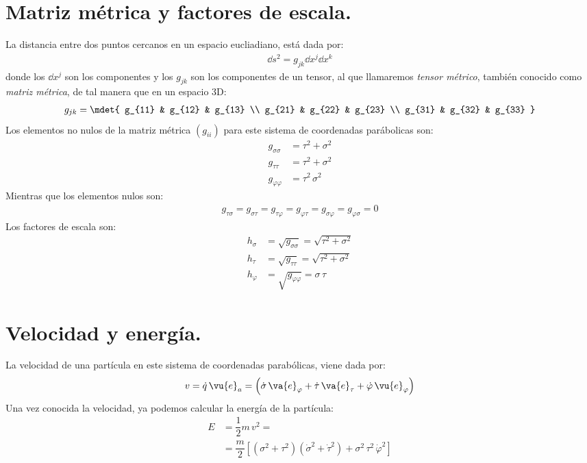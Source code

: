 \section{Matriz métrica y factores de escala.}
La distancia entre dos puntos cercanos en un espacio eucliadiano, está dada por:
\begin{align*}
\dd{s^{2}} = g_{jk} \dd{x^{j}} \dd{x^{k}}
\end{align*}
donde los $\dd{x^{j}}$ son los componentes y los $g_{jk}$ son los componentes de un tensor, al que llamaremos \emph{tensor métrico}, también conocido como \emph{matriz métrica}, de tal manera que en un espacio 3D:
\begin{align*}
g_{jk} = \mdet{
g_{11} & g_{12} & g_{13} \\
g_{21} & g_{22} & g_{23} \\
g_{31} & g_{32} & g_{33}
}
\end{align*}
Los elementos no nulos de la matriz métrica $(g_{ii})$ para este sistema de coordenadas parábolicas son:
\begin{align*}
g_{\sigma \sigma} &= \tau^{2} + \sigma^{2} \\[0.5em]
g_{\tau \tau} &= \tau^{2} + \sigma^{2} \\[0.5em]
g_{\varphi \varphi} &= \tau^{2} \, \sigma^{2}
\end{align*}
Mientras que los elementos nulos son:
\begin{align*}
g_{\tau \sigma} = g_{\sigma \tau} = g_{\tau \varphi} = g_{\varphi \tau} = g_{\sigma \varphi} = g_{\varphi \sigma} = 0
\end{align*}
Los factores de escala son:
\begin{align*}
h_{\sigma} &= \sqrt{g_{\sigma \sigma}} = \sqrt{\tau^{2} + \sigma^{2}} \\[0.5em]
h_{\tau} &= \sqrt{g_{\tau \tau}} = \sqrt{\tau^{2} + \sigma^{2}} \\[0.5em]
h_{\varphi} &= \sqrt{g_{\varphi \varphi}} = \sigma \, \tau
\end{align*}
\section{Velocidad y energía.}
La velocidad de una partícula en este sistema de coordenadas parabólicas, viene dada por:
\begin{align*}
v = \dot{q} \, \vu{e}_{a} = \left( \dot{\sigma} \, \va{e}_{\varphi} + \dot{\tau} \, \va{e}_{\tau} + \dot{\varphi} \, \vu{e}_{\varphi} \right)
\end{align*}
Una vez conocida la velocidad, ya podemos calcular la energía de la partícula:
\begin{align*}
E &= \dfrac{1}{2} m \, v^{2} = \\[0.5em]
&= \dfrac{m}{2} \left[ (\sigma^{2} + \tau^{2}) (\dot{\sigma}^{2} + \dot{\tau}^{2}) + \sigma^{2} \, \tau^{2} \, \dot{\varphi}^{2} \right]
\end{align*}
